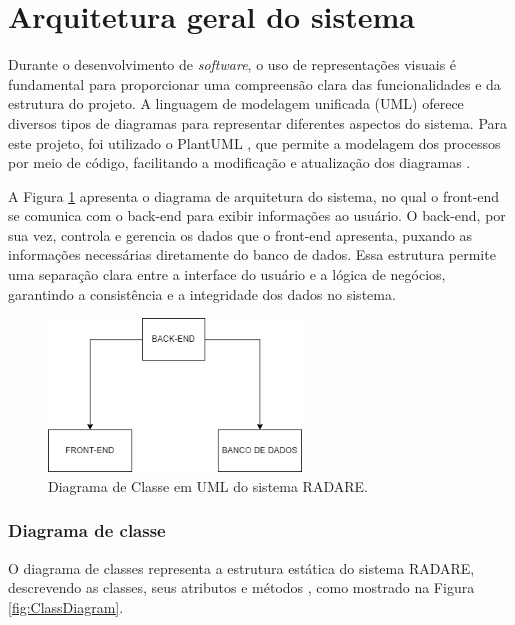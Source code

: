 \section{Arquitetura geral do sistema}

Durante o desenvolvimento de \textit{software}, o uso de representações visuais é fundamental para proporcionar uma compreensão clara das funcionalidades e da estrutura do projeto. A linguagem de modelagem unificada (UML) oferece diversos tipos de diagramas para representar diferentes aspectos do sistema. Para este projeto, foi utilizado o PlantUML \cite{plantumldoc}, que permite a modelagem dos processos por meio de código, facilitando a modificação e atualização dos diagramas \cite{softwareengreq}.

A Figura \ref{fig:ArchitectureDiagram} apresenta o diagrama de arquitetura do sistema, no qual o front-end se comunica com o back-end para exibir informações ao usuário. O back-end, por sua vez, controla e gerencia os dados que o front-end apresenta, puxando as informações necessárias diretamente do banco de dados. Essa estrutura permite uma separação clara entre a interface do usuário e a lógica de negócios, garantindo a consistência e a integridade dos dados no sistema.

\begin{figure}[htbp!]
	\centering
        \includegraphics[width=0.6\textwidth]{figuras/Untitled Diagram.drawio (1).png}
	\caption{Diagrama de Classe em UML do sistema RADARE.}
	\label{fig:ArchitectureDiagram}
\end{figure}


\subsubsection{Diagrama de classe}

O diagrama de classes representa a estrutura estática do sistema RADARE, descrevendo as classes, seus atributos e métodos \cite{softwareenguml}, como mostrado na Figura \ref{fig:ClassDiagram}.

